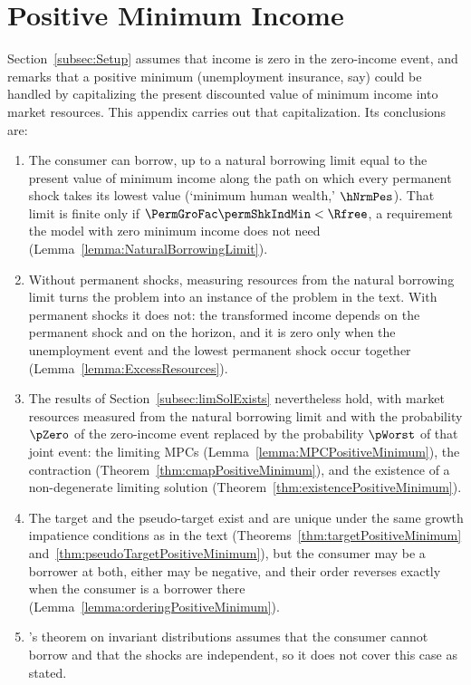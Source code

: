 \documentclass[\econtexRoot/BufferStockTheory]{subfiles}
\begin{document}
\hypertarget{ApndxPositiveMinimumIncome}{}
\section{Positive Minimum Income}\label{sec:ApndxPositiveMinimumIncome}

Section~\ref{subsec:Setup} assumes that income is zero in the zero-income event, and remarks that a positive minimum (unemployment insurance, say) could be handled by capitalizing the present discounted value of minimum income into market resources.
This appendix carries out that capitalization.
Its conclusions are:

\begin{enumerate}
\item The consumer can borrow, up to a natural borrowing limit equal to the present value of minimum income along the path on which every permanent shock takes its lowest value (`minimum human wealth,' $\hNrmPes$).
That limit is finite only if $\PermGroFac\permShkIndMin<\Rfree$, a requirement the model with zero minimum income does not need (Lemma~\ref{lemma:NaturalBorrowingLimit}).
\item Without permanent shocks, measuring resources from the natural borrowing limit turns the problem into an instance of the problem in the text.
With permanent shocks it does not: the transformed income depends on the permanent shock and on the horizon, and it is zero only when the unemployment event and the lowest permanent shock occur together (Lemma~\ref{lemma:ExcessResources}).
\item The results of Section~\ref{subsec:limSolExists} nevertheless hold, with market resources measured from the natural borrowing limit and with the probability $\pZero$ of the zero-income event replaced by the probability $\pWorst$ of that joint event: the limiting MPCs (Lemma~\ref{lemma:MPCPositiveMinimum}), the contraction (Theorem~\ref{thm:cmapPositiveMinimum}), and the existence of a non-degenerate limiting solution (Theorem~\ref{thm:existencePositiveMinimum}).
\item The target and the pseudo-target exist and are unique under the same growth impatience conditions as in the text (Theorems~\ref{thm:targetPositiveMinimum} and~\ref{thm:pseudoTargetPositiveMinimum}), but the consumer may be a borrower at both, either may be negative, and their order reverses exactly when the consumer is a borrower there (Lemma~\ref{lemma:orderingPositiveMinimum}).
\item \cite{szeidlInvariant}'s theorem on invariant distributions assumes that the consumer cannot borrow and that the shocks are independent, so it does not cover this case as stated.

\end{enumerate}
\end{document}
